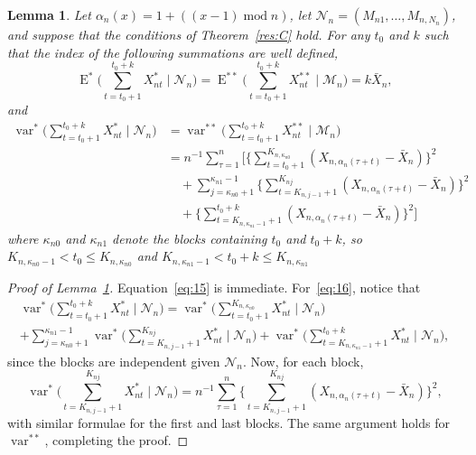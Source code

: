 \documentclass[12pt]{article}
\newtheorem{lema}{Lemma}[section]
\theoremstyle{definition}
\DeclareMathOperator{\E}{E}
\DeclareMathOperator{\var}{var}
\renewcommand{\mod}{\operatorname{mod}}
\begin{document}
\begin{lema}\label{res:a4}
  Let $\alpha_n(x)= 1 + ((x-1) \mod n)$, let $\mathcal{N}_n =
  (M_{n1},\dots,M_{n,N_n})$, and suppose that the conditions of
  Theorem~\ref{res:C} hold.  For any $t_0$ and $k$ such that the index
  of the following summations are well defined,
  \begin{equation}\label{eq:15}
    \E^*\Bigg(\sum_{t=t_0+1}^{t_0+k} X_{nt}^* \;\Bigg|\;
    \mathcal{N}_n\Bigg) = \E^{**}\Bigg(\sum_{t=t_0+1}^{t_0+k}
    X_{nt}^{**} \;\Bigg|\; \mathcal{M}_n\Bigg) = k \bar{X}_n,
  \end{equation}
  and
  \begin{align}
    \var^*\Bigg(\sum_{t=t_0+1}^{t_0+k} X_{nt}^* \;\Bigg|\;
    \mathcal{N}_n\Bigg) &= 
    \var^{**}\Bigg(\sum_{t=t_0+1}^{t_0+k} X_{nt}^{**} \;\Bigg|\;
    \mathcal{M}_n\Bigg) \nonumber
    \\& = 
    n^{-1} \sum_{\tau=1}^n \Bigg[ \Bigg\{\sum_{t=t_0 + 1}^{K_{n,\kappa_{n0}}}
       (X_{n,\alpha_n(\tau+t)} - \bar{X}_n)\Bigg\}^2 \nonumber
    \\ &\quad +  
      \sum_{j=\kappa_{n0}+1}^{\kappa_{n1}-1}
       \Bigg\{\sum_{t=K_{n,j -1}+1}^{K_{nj}}
       (X_{n,\alpha_n(\tau+t)} - \bar{X}_n)\Bigg\}^2 \nonumber
    \\ &\quad +
       \Bigg\{\sum_{t=K_{n,\kappa_{n1} - 1} + 1}^{t_0 + k}
       (X_{n,\alpha_n(\tau + t)} - \bar{X}_n) \Bigg\}^2 \Bigg] \label{eq:16} 
  \end{align}
  where $\kappa_{n0}$ and $\kappa_{n1}$ denote the blocks containing $t_0$
  and $t_0 + k$, so $K_{n,\kappa_{n0} - 1} < t_0 \leq K_{n,\kappa_{n0}}$ and
  $K_{n,\kappa_{n1} - 1} < t_0 + k \leq K_{n,\kappa_{n1}}$
\end{lema}

\begin{proof}[Proof of Lemma~\ref{res:a4}]
  Equation~\eqref{eq:15} is immediate.  For~\eqref{eq:16}, notice that
  \begin{multline}
    \var^*\Bigg(\sum_{t=t_0+1}^{t_0+k} X_{nt}^* \;\Bigg|\;
    \mathcal{N}_n\Bigg) = \var^{*}\Bigg( \sum_{t=t_0+1}^{K_{n,\kappa_{n0}}}
    X_{nt}^* \;\Bigg|\; \mathcal{N}_n \Bigg) 
    \\ 
    + \sum_{j=\kappa_{n0} + 1}^{\kappa_{n1} - 1} \var^{*}\Bigg(
    \sum_{t=K_{n,j-1}+1}^{K_{nj}} X_{nt}^* \;\Bigg|\; \mathcal{N}_n
    \Bigg) + \var^{*}\Bigg( \sum_{t=K_{n,\kappa_{n1} - 1}+1}^{t_0 + k}
    X_{nt}^* \;\Bigg|\; \mathcal{N}_n \Bigg),
  \end{multline}
  since the blocks are independent given $\mathcal{N}_n$.  Now, for
  each block,
  \begin{equation}
    \var^{*}\Bigg(
    \sum_{t=K_{n,j-1}+1}^{K_{nj}} X_{nt}^* \;\Bigg|\; \mathcal{N}_n
    \Bigg) = n^{-1} \sum_{\tau=1}^n 
    \Bigg\{\sum_{t=K_{n,j -1}+1}^{K_{nj}} (X_{n,\alpha_n(\tau+t)} -
    \bar{X}_n)\Bigg\}^2,
  \end{equation}
  with similar formulae for the first and last blocks.
  The same argument holds for $\var^{**}$, completing the proof.
\end{proof}
\end{document}
